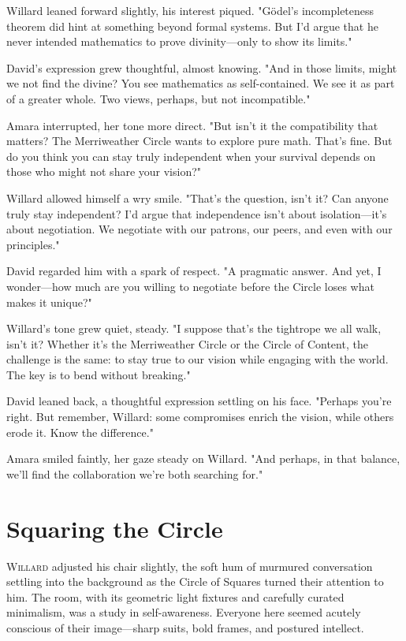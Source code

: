 Willard leaned forward slightly, his interest piqued. "Gödel’s incompleteness theorem did hint at something beyond formal systems. But I’d argue that he never intended mathematics to prove divinity—only to show its limits."
\smallskip

David’s expression grew thoughtful, almost knowing. "And in those limits, might we not find the divine? You see mathematics as self-contained. We see it as part of a greater whole. Two views, perhaps, but not incompatible."
\smallskip

Amara interrupted, her tone more direct. "But isn’t it the compatibility that matters? The Merriweather Circle wants to explore pure math. That’s fine. But do you think you can stay truly independent when your survival depends on those who might not share your vision?"
\smallskip

Willard allowed himself a wry smile. "That’s the question, isn’t it? Can anyone truly stay independent? I’d argue that independence isn’t about isolation—it’s about negotiation. We negotiate with our patrons, our peers, and even with our principles."
\smallskip

David regarded him with a spark of respect. "A pragmatic answer. And yet, I wonder—how much are you willing to negotiate before the Circle loses what makes it unique?"
\smallskip

Willard’s tone grew quiet, steady. "I suppose that’s the tightrope we all walk, isn’t it? Whether it’s the Merriweather Circle or the Circle of Content, the challenge is the same: to stay true to our vision while engaging with the world. The key is to bend without breaking."
\smallskip

David leaned back, a thoughtful expression settling on his face. "Perhaps you’re right. But remember, Willard: some compromises enrich the vision, while others erode it. Know the difference."
\smallskip

Amara smiled faintly, her gaze steady on Willard. "And perhaps, in that balance, we’ll find the collaboration we’re both searching for."


\newpage
\section*{Squaring the Circle}


\smallskip

\lettrine{W}{illard} adjusted his chair slightly, the soft hum of murmured conversation settling into the background as the Circle of Squares turned their attention to him. The room, with its geometric light fixtures and carefully curated minimalism, was a study in self-awareness. Everyone here seemed acutely conscious of their image—sharp suits, bold frames, and postured intellect.

